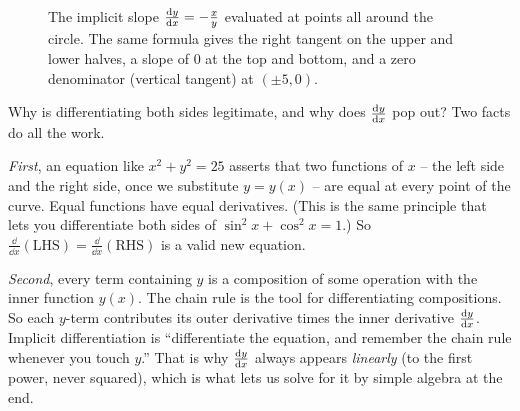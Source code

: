 \begin{figure}[htbp]
\centering
{}
\caption{The implicit slope $\frac{\mathrm{d} y}{\mathrm{d} x}=-\tfrac{x}{y}$ evaluated at points all around the circle.
The same formula gives the right tangent on the upper and lower halves, a slope of $0$ at the top
and bottom, and a zero denominator (vertical tangent) at $(\pm5,0)$.}
\label{ch13:fig-circle-slopes}
\end{figure}

\begin{whybox}
Why is differentiating both sides legitimate, and why does $\frac{\mathrm{d} y}{\mathrm{d} x}$ pop out? Two facts do all the
work.

\emph{First}, an equation like $x^2+y^2=25$ asserts that two functions of $x$ -- the left side and
the right side, once we substitute $y=y(x)$ -- are equal at every point of the curve. Equal
functions have equal derivatives. (This is the same principle that lets you differentiate both sides
of $\sin^2 x + \cos^2 x = 1$.) So $\frac{\dd}{\dd x}(\text{LHS}) = \frac{\dd}{\dd x}(\text{RHS})$ is
a valid new equation.

\emph{Second}, every term containing $y$ is a composition of some operation with the inner
function $y(x)$. The chain rule is the tool for differentiating compositions. So each
$y$-term contributes its outer derivative times the inner derivative $\frac{\mathrm{d} y}{\mathrm{d} x}$. Implicit
differentiation is ``differentiate the equation, and remember the chain rule
whenever you touch $y$.'' That is why $\frac{\mathrm{d} y}{\mathrm{d} x}$ always appears \emph{linearly} (to the first
power, never squared), which is what lets us solve for it by simple algebra at the end.
\end{whybox}

